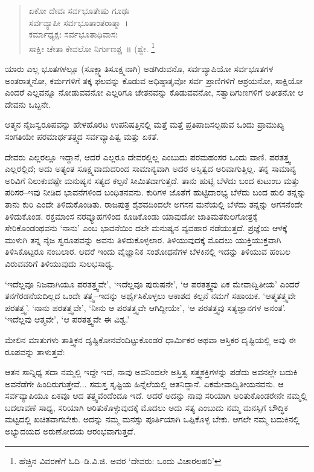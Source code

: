\begin{verse}
ಏಕೋ ದೇವಃ ಸರ್ವಭೂತೇಷು ಗೂಢಃ\\
 ಸರ್ವವ್ಯಾಪೀ ಸರ್ವಭೂತಾಂತರಾತ್ಮಾ~।\\
 ಕರ್ಮಾಧ್ಯಕ್ಷಃ ಸರ್ವಭೂತಾಧಿವಾಸಃ \\
 ಸಾಕ್ಷೀ ಚೇತಾ ಕೇವಲೋ ನಿರ್ಗುಣಶ್ಚ~॥ (ಶ್ವೇ. \footnote{ ಹೆಚ್ಚಿನ ವಿವರಣೆಗೆ ಓದಿ–ಡಿ.ವಿ.ಜಿ. ಅವರ ‘ದೇವರು: ಒಂದು ವಿಚಾರಲಹರಿ’}
\end{verse}

ಯಾರು ಎಲ್ಲ ಭೂತಗಳಲ್ಲೂ (ಸೂಕ್ಷ್ಮಾತಿಸೂಕ್ಷ್ಮನಾಗಿ) ಅಡಗಿರುವನೊ, ಸರ್ವವ್ಯಾಪಿಯೋ ಸರ್ವಭೂತಗಳ ಅಂತರಾತ್ಮನೋ, ಕರ್ಮಗಳಿಗೆ ತಕ್ಕ ಫಲವನ್ನು ಕೊಡುವ ಅಧಿಷ್ಠಾತೃವೋ ಸರ್ವ ಪ್ರಾಣಿಗಳಿಗೆ ಆಶ್ರಯನೋ, ಸಾಕ್ಷಿಯೋ ಎಂದರೆ ಎಲ್ಲವನ್ನೂ ನೋಡುವವನೋ ಎಲ್ಲರಿಗೂ ಚೇತನವನ್ನು ಕೊಡುವವನೋ, ಸತ್ವಾದಿಗುಣಗಳಿಗೆ ಅತೀತನೋ ಆ ದೇವನು ಒಬ್ಬನೇ.

ಆತ್ಮನ ನೈಜಸ್ವರೂಪವನ್ನು ಹೇಳಹೊರಟ ಉಪನಿಷತ್ತಿನಲ್ಲಿ ಮತ್ತೆ ಮತ್ತೆ ಪ್ರತಿಪಾದಿಸಲ್ಪಡುವ ಒಂದು ಪ್ರಾಮುಖ್ಯ ಸಂಗತಿಯೇ ಪರಮಾರ್ಥತತ್ತ್ವದ ಸರ್ವವ್ಯಾಪಿತ್ವ ಮತ್ತು ಏಕತೆ.

ದೇವರು ಎಲ್ಲರಲ್ಲೂ ಇದ್ದಾನೆ, ಆದರೆ ಎಲ್ಲರೂ ದೇವರಲ್ಲಿಲ್ಲ ಎಂಬುದು ಪರಮಹಂಸರ ಒಂದು ವಾಣಿ. ಪರತತ್ತ್ವ ಎಲ್ಲರಲ್ಲಿದೆ; ಅದು ಅತ್ಯಂತ ಸೂಕ್ಷ್ಮವಾದುದರಿಂದ ಸಾಮಾನ್ಯವಾಗಿ ಅದರ ಅಸ್ತಿತ್ವದ ಅರಿವಾಗುತ್ತಿಲ್ಲ. ತನ್ನ ಸಾಮಾನ್ಯ ಅರಿವಿಗೆ ನಿಲುಕುವಷ್ಟೇ ಮನುಷ್ಯನ ಸತ್ಯದ ಕಲ್ಪನೆ ಸೀಮಿತವಾಗುತ್ತದೆ. ತಾನು ಹುಟ್ಟಿ ಬೆಳೆದು ಬಂದ ಕುಟುಂಬ ಮತ್ತು ಪರಿಸರ–ಇವು ನೀಡಿದ ಭಾವನೆಗಳಿಂದ ಬಂಧಿತನವನು. ಕುರಿಗಳ ಜೊತೆಗೆ ಹುಟ್ಟಿದಾರಭ್ಯ ಬೆಳೆದು ಬಂದ ಹುಲಿ ತನ್ನನ್ನು ತಾನು ಕುರಿ ಎಂದೇ ತಿಳಿದುಕೊಂಡಿತು. ರಾಜಪುತ್ರ ಶೈಶವದಿಂದಲೇ ಅಗಸನ ಮನೆಯಲ್ಲಿ ಬೆಳೆದು ತನ್ನನ್ನು ಅಗಸನೆಂದೇ ತಿಳಿದುಕೊಂಡ. ರಕ್ತಮಾಂಸ ನರವ್ಯೂಹಗಳಿಂದ ಕೂಡಿಕೊಂಡು ಯಾವುದೋ ಜಾತಿಮತಕುಲಗೋತ್ರಕ್ಕೆ ಸೇರಿಕೊಂಡಂಥವನು ‘ನಾನು’ ಎಂಬ ಭಾವನೆಯಿಂ ದಲೇ ಮನುಷ್ಯನ ವ್ಯವಹಾರ ನಡೆಯುತ್ತದೆ. ಪ್ರಜ್ಞೆಯ ಆಳಕ್ಕೆ ಮುಳುಗಿ ತನ್ನ ನೈಜ ಸ್ವರೂಪವನ್ನು ಅವನು ತಿಳಿದುಕೊಳ್ಳಲಾರ. ತಿಳಿಯುವುದಕ್ಕೆ ಮೊದಲು ಯುಕ್ತಿಯುಕ್ತವಾಗಿ ತಿಳಿಸಿಕೊಟ್ಟರೂ ನಂಬಲಾರ. ಆದರೆ ಇಂದು ವೈಜ್ಞಾನಿಕ ಸಂಶೋಧನೆಗಳ ಬೆಳಕಿನಲ್ಲಿ ಇದನ್ನು ತಿಳಿಯುವ ಹಂಬಲ ವಿರುವವರಿಗೆ ತಿಳಿಯುವುದು ಸುಲಭಸಾಧ್ಯ.

‘ಇದೆಲ್ಲವೂ ನಿಜವಾಗಿಯೂ ಪರತತ್ತ್ವವೇ’, ‘ಇದೆಲ್ಲವೂ ಪುರುಷನೇ’, ‘ಆ ಪರತತ್ತ್ವವು ಏಕ ಮೇವಾದ್ವಿತೀಯ’ ಎಂದರೆ ತನಗೆರಡನೆಯದಿಲ್ಲದ ಒಂದೇ ತತ್ತ್ವ–ಇದನ್ನು ಅರ್ಥೈಸಿಕೊಳ್ಳಲು ಆಕಾಶದ ಕಲ್ಪನೆ ನಮಗೆ ಸಹಾಯಕ. ‘ಆತ್ಮತತ್ತ್ವವೇ ಪರತತ್ತ್ವ’. ‘ನಾನು ಪರತತ್ತ್ವವೇ’, ‘ನೀನು ಆ ಪರತತ್ತ್ವವೇ ಆಗಿದ್ದೀಯೇ’, ‘ಆ ಪರತತ್ತ್ವವು ಸತ್ಯಜ್ಞಾನಗಳ ಅನಂತ’. ‘ಇದೆಲ್ಲವು ಆತ್ಮವೇ’, ‘ಆ ಪರತತ್ತ್ವವೇ ಈ ವಿಶ್ವ.’

ಮೇಲಿನ ಮಾತುಗಳು ತಾತ್ತ್ವಿಕನ ದೃಷ್ಟಿಕೋನವೆಂದಿಟ್ಟುಕೊಂಡರೆ ಧಾರ್ಮಿಕರ ಅಥವಾ ಆಸ್ತಿಕರ ದೃಷ್ಟಿಯಲ್ಲಿ ಅವು ಈ ರೂಪವನ್ನು ತಾಳುತ್ತವೆ:

ಆತನ ಸಾನ್ನಿಧ್ಯ ಸದಾ ನಮ್ಮಲ್ಲಿ ಇದ್ದೇ ಇದೆ, ನಾವು ಅವನಿಂದಲೇ ಅಸ್ತಿತ್ವ ಸತ್ತ್ವಶಕ್ತಿಗಳನ್ನು ಪಡೆದು ಅವನಲ್ಲೇ ಬದುಕಿ ಅವನೆಡೆಗೇ ಹಿಂದಿರುಗುತ್ತೇವೆ... ಸಮಸ್ತ ಸೃಷ್ಟಿಯ ಹಿನ್ನೆಲೆಯಲ್ಲಿ ಆತನಿದ್ದಾನೆ. ಏಕಮೇವಾದ್ವಿತೀಯನವನು. ಆ ಸರ್ವವ್ಯಾಪಿಯೂ ಏಕವೂ ಆದ ತತ್ತ್ವವೆಂದೆಂದೂ ಇದೆ. ಆದರೆ ಅದನ್ನು ನಾವು ಸರಿಯಾಗಿ ಅರಿತುಕೊಂಡರೇನೇ ನಮ್ಮಲ್ಲಿ ಬದಲಾವಣೆ ಸಾಧ್ಯ, ಸರಿಯಾಗಿ ಅರಿತುಕೊಳ್ಳುವುದಕ್ಕೆ ಮೊದಲು ಅದು ಸತ್ಯ ಎಂಬುದು ನಮ್ಮ ಮನಸ್ಸಿಗೆ ಬೌದ್ಧಿಕ ಮಟ್ಟದಲ್ಲಿ ಖಚಿತವಾಗಬೇಕು. ಅದನ್ನು ನಮ್ಮ ಮನಸ್ಸು ಪೂರ್ತಿಯಾಗಿ ಒಪ್ಪಿಕೊಳ್ಳ ಬೇಕು. ಆಗಲೇ ನಮ್ಮ ಬದುಕಿನಲ್ಲಿ ಅಭ್ಯುದಯದ ಅರುಣೋದಯ ಆರಂಭವಾಗುತ್ತದೆ.

